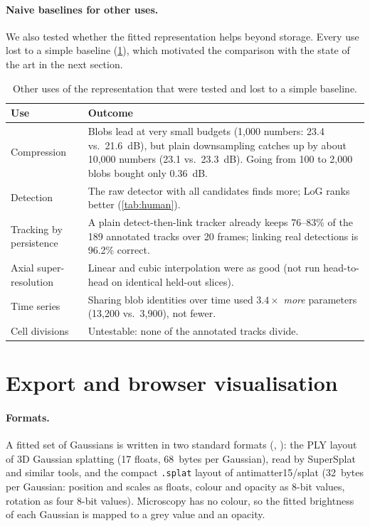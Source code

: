 \documentclass[
  paper=a4,
  fontsize=11pt,
  english,
  numbers=noenddot,
  parskip=half,
  cdgeometry=symmetric,
  cd=barcolor,
  cdfont=false
]{tudscrartcl}
\begin{document}
\paragraph{Naive baselines for other uses.} We also tested whether the fitted representation
helps beyond storage. Every use lost to a simple baseline (\cref{tab:neg}), which motivated
the comparison with the state of the art in the next section.

\begin{table}[tb]
  \centering\small
  \begin{tabularx}{\linewidth}{@{}l>{\raggedright\arraybackslash}X@{}}
    \toprule
    Use & Outcome \\
    \midrule
    Compression & Blobs lead at very small budgets (1{,}000 numbers: 23.4 vs.\ \SI{21.6}{dB}),
      but plain downsampling catches up by about 10{,}000 numbers (23.1 vs.\ \SI{23.3}{dB}).
      Going from 100 to 2{,}000 blobs bought only \SI{0.36}{dB}. \\
    Detection & The raw detector with all candidates finds more; LoG ranks better (\cref{tab:human}). \\
    Tracking by persistence & A plain detect-then-link tracker already keeps 76--83\% of the 189
      annotated tracks over 20 frames; linking real detections is 96.2\% correct. \\
    Axial super-resolution & Linear and cubic interpolation were as good (not run head-to-head
      on identical held-out slices). \\
    Time series & Sharing blob identities over time used $3.4\times$ \emph{more} parameters
      (13{,}200 vs.\ 3{,}900), not fewer. \\
    Cell divisions & Untestable: none of the annotated tracks divide. \\
    \bottomrule
  \end{tabularx}
  \caption{Other uses of the representation that were tested and lost to a simple baseline.}
  \label{tab:neg}
\end{table}

\section{Export and browser visualisation}\label{sec:export}

\paragraph{Formats.} A fitted set of Gaussians is written in two standard formats
(, ): the PLY layout of 3D Gaussian
splatting (17 floats, 68~bytes per Gaussian), read by SuperSplat and similar tools, and the
compact \texttt{.splat} layout of antimatter15/splat (32~bytes per Gaussian: position and
scales as floats, colour and opacity as 8-bit values, rotation as four 8-bit values).
Microscopy has no colour, so the fitted brightness of each Gaussian is mapped to a grey value
and an opacity.
\end{document}
